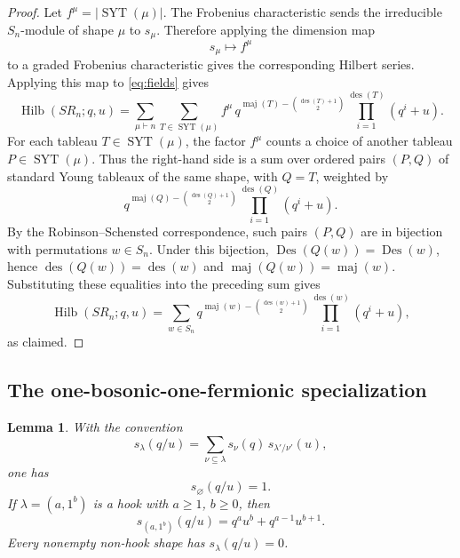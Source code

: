 \documentclass[12pt]{article}
\newtheorem{lemma}[theorem]{Lemma}
\DeclareMathOperator{\Hilb}{Hilb}
\DeclareMathOperator{\Des}{Des}
\DeclareMathOperator{\des}{des}
\DeclareMathOperator{\maj}{maj}
\newcommand{\SYT}{\operatorname{SYT}}
\begin{document}
\begin{proof}
Let \(f^\mu=|\SYT(\mu)|\).  The Frobenius characteristic sends the irreducible \(S_n\)-module of shape \(\mu\) to \(s_\mu\).  Therefore applying the dimension map
\[
s_\mu\longmapsto f^\mu
\]
to a graded Frobenius characteristic gives the corresponding Hilbert series.  Applying this map to \eqref{eq:fields} gives
\[
\Hilb(SR_n;q,u)
=
\sum_{\mu\vdash n}
\sum_{T\in \SYT(\mu)}
f^\mu\,
q^{\maj(T)-\binom{\des(T)+1}{2}}
\prod_{i=1}^{\des(T)}(q^i+u).
\]
For each tableau \(T\in\SYT(\mu)\), the factor \(f^\mu\) counts a choice of another tableau \(P\in\SYT(\mu)\).  Thus the right-hand side is a sum over ordered pairs \((P,Q)\) of standard Young tableaux of the same shape, with \(Q=T\), weighted by
\[
q^{\maj(Q)-\binom{\des(Q)+1}{2}}
\prod_{i=1}^{\des(Q)}(q^i+u).
\]
By the Robinson--Schensted correspondence, such pairs \((P,Q)\) are in bijection with permutations \(w\in S_n\).  Under this bijection, \(\Des(Q(w))=\Des(w)\), hence \(\des(Q(w))=\des(w)\) and \(\maj(Q(w))=\maj(w)\).  Substituting these equalities into the preceding sum gives
\[
\Hilb(SR_n;q,u)
=
\sum_{w\in S_n}
q^{\maj(w)-\binom{\des(w)+1}{2}}
\prod_{i=1}^{\des(w)}(q^i+u),
\]
as claimed.
\end{proof}

\subsection{The one-bosonic-one-fermionic specialization}

\begin{lemma}\label{lem:super-schur}
With the convention
\[
s_\lambda(q/u)=\sum_{\nu\subseteq\lambda}s_\nu(q)\,s_{\lambda'/\nu'}(u),
\]
one has
\[
s_{\varnothing}(q/u)=1.
\]
If \(\lambda=(a,1^b)\) is a hook with \(a\ge 1\), \(b\ge 0\), then
\[
s_{(a,1^b)}(q/u)=q^a u^b+q^{a-1}u^{b+1}.
\]
Every nonempty non-hook shape has \(s_\lambda(q/u)=0\).
\end{lemma}
\end{document}
